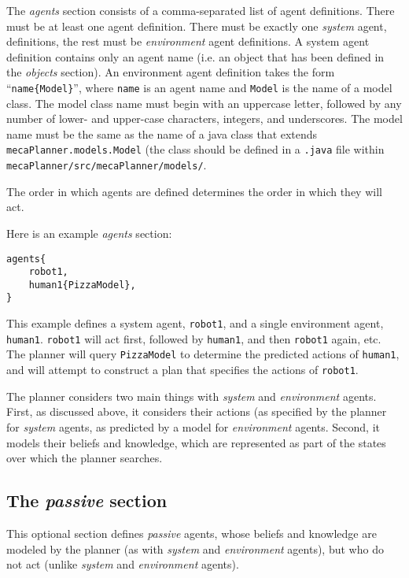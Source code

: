 \documentclass{article}
\begin{document}
The \emph{agents} section consists of a comma-separated list of agent
definitions. There must be at least one agent definition. There must be exactly
one \emph{system} agent, definitions, the rest must be \emph{environment} agent
definitions. A system agent definition contains only an agent name (i.e. an
object that has been defined in the \emph{objects} section). An environment
agent definition takes the form ``\texttt{name\{Model\}}'', where \texttt{name}
is an agent name and \texttt{Model} is the name of a model class. The model
class name must begin with an uppercase letter, followed by any number of
lower- and upper-case characters, integers, and underscores. The model name must
be the same as the name of a java class that extends
\texttt{mecaPlanner.models.Model} (the class should be defined in a
\texttt{.java} file within \texttt{mecaPlanner/src/mecaPlanner/models/}.

The order in which agents are defined determines the order in which they will
act.

Here is an example \emph{agents} section:
\begin{verbatim}
agents{
    robot1,
    human1{PizzaModel},
}
\end{verbatim}

This example defines a system agent, \texttt{robot1}, and a single environment
agent, \texttt{human1}. \texttt{robot1} will act first, followed by
\texttt{human1}, and then \texttt{robot1} again, etc. The planner will query
\texttt{PizzaModel} to determine the predicted actions of \texttt{human1}, and
will attempt to construct a plan that specifies the actions of \texttt{robot1}.

The planner considers two main things with \emph{system} and \emph{environment}
agents. First, as discussed above, it considers their actions (as specified by
the planner for \emph{system} agents, as predicted by a model for
\emph{environment} agents. Second, it models their beliefs and knowledge, which
are represented as part of the states over which the planner searches.


\subsection{The \emph{passive} section}

This optional section defines \emph{passive} agents, whose beliefs and knowledge are
modeled by the planner (as with \emph{system} and \emph{environment} agents), but
who do not act (unlike \emph{system} and \emph{environment} agents).
\end{document}
